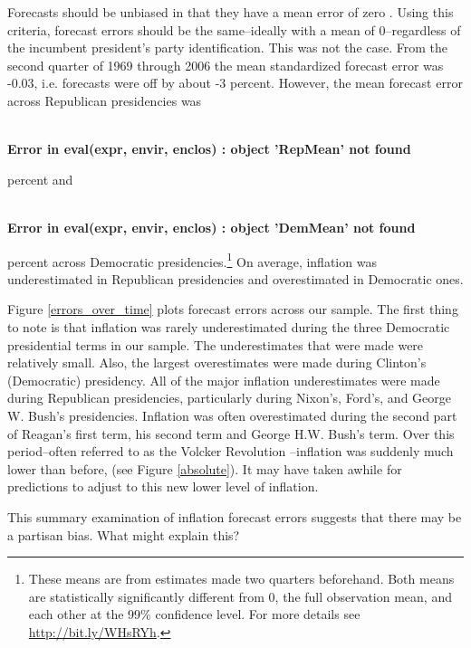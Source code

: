\documentclass[a4paper]{article}
\begin{document}
Forecasts should be unbiased in that they have a mean error of zero \citep[5]{Bruck2006}. Using this criteria, forecast errors should be the same--ideally with a mean of 0--regardless of the incumbent president's party identification. This was not the case. From the second quarter of 1969 through 2006 the mean standardized forecast error was -0.03, i.e. forecasts were off by about -3 percent. However, the mean  forecast error across Republican presidencies was \begin{flushleft}\ttfamily\noindent\bfseries\textcolor{errorcolor}{ \\ 
Error in eval(expr, envir, enclos) : object 'RepMean' not found}\end{flushleft} percent and \begin{flushleft}\ttfamily\noindent\bfseries\textcolor{errorcolor}{ \\ 
Error in eval(expr, envir, enclos) : object 'DemMean' not found}\end{flushleft} percent across Democratic presidencies.\footnote{These means are from estimates made two quarters beforehand. Both means are statistically significantly different from 0, the full observation mean, and each other at the 99\% confidence level. For more details see \url{http://bit.ly/WHsRYh}.} On average, inflation was underestimated in Republican presidencies and overestimated in Democratic ones.

Figure \ref{errors_over_time} plots forecast errors across our sample. The first thing to note is that inflation was rarely underestimated during the three Democratic presidential terms in our sample. The underestimates that were made were relatively small. Also, the largest overestimates were made during Clinton's (Democratic) presidency. All of the major inflation underestimates were made during Republican presidencies, particularly during Nixon's, Ford's, and George W. Bush's presidencies. Inflation was often overestimated during the second part of Reagan's first term, his second term and George H.W. Bush's term. Over this period--often referred to as the Volcker Revolution \citep[see][]{Bartels1985}--inflation was suddenly much lower than before, (see Figure \ref{absolute}). It may have taken awhile for predictions to adjust to this new lower level of inflation.

This summary examination of inflation forecast errors suggests that there may be a partisan bias. What might explain this?
\end{document}
